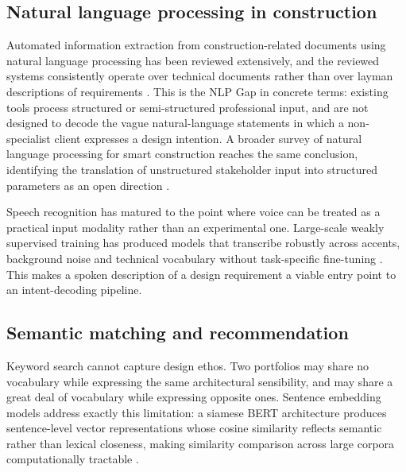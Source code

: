 \subsection{Natural language processing in construction}
\label{subsec:lit-nlp}


Automated information extraction from construction-related documents
using natural language processing has been reviewed extensively, and
the reviewed systems consistently operate over technical documents
rather than over layman descriptions of requirements
\cite{lee2017extraction}. This is the NLP Gap in concrete terms:
existing tools process structured or semi-structured professional
input, and are not designed to decode the vague natural-language
statements in which a non-specialist client expresses a design
intention. A broader survey of natural language processing for smart
construction reaches the same conclusion, identifying the translation
of unstructured stakeholder input into structured parameters as an open
direction \cite{wu2022nlp}.

Speech recognition has matured to the point where voice can be treated
as a practical input modality rather than an experimental one.
Large-scale weakly supervised training has produced models that
transcribe robustly across accents, background noise and technical
vocabulary without task-specific fine-tuning
\cite{radford2022whisper}. This makes a spoken description of a design
requirement a viable entry point to an intent-decoding pipeline.


\subsection{Semantic matching and recommendation}
\label{subsec:lit-semantic}


Keyword search cannot capture design ethos. Two portfolios may share no
vocabulary while expressing the same architectural sensibility, and may
share a great deal of vocabulary while expressing opposite ones.
Sentence embedding models address exactly this limitation: a siamese
BERT architecture produces sentence-level vector representations whose
cosine similarity reflects semantic rather than lexical closeness,
making similarity comparison across large corpora computationally
tractable \cite{reimers2019sbert}.

